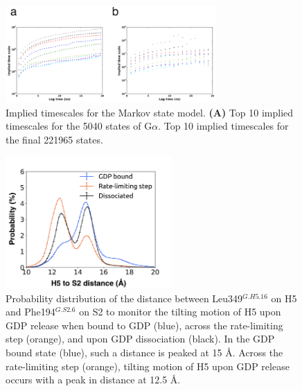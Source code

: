 \documentclass[../main.tex]{subfiles}
\begin{document}
    \begin{figure}[!htb] %
        \centering
        \includegraphics[width=3.16in]{ch4-fig2-supp5.png}
        \caption[Implied timescales for the Markov state model.]
            {Implied timescales for the Markov state model. \textbf{(A)} Top 10 implied timescales for the 5040 states of G$\alpha$.  Top 10 implied timescales for the final 221965 states.}
        \label{fig:ch4-fig2-supp5}
    \end{figure}

    \begin{figure}[!htb] %
        \centering
        \includegraphics[width=2.5in]{ch4-fig3-supp1.png}
        \caption[Probability distribution of the distance between Leu349$^{G.H5.16}$ on H5 and Phe194$^{G.S2.6}$ on S2 to monitor the tilting motion of H5 upon GDP release when bound to GDP (blue), across the rate-limiting step (orange), and upon GDP dissociation (black).]
            {Probability distribution of the distance between Leu349$^{G.H5.16}$ on H5 and Phe194$^{G.S2.6}$ on S2 to monitor the tilting motion of H5 upon GDP release when bound to GDP (blue), across the rate-limiting step (orange), and upon GDP dissociation (black). In the GDP bound state (blue), such a distance is peaked at 15 \AA. Across the rate-limiting step (orange), tilting motion of H5 upon GDP release occurs with a peak in distance at 12.5 \AA.}
        \label{fig:ch4-fig3-supp1}
    \end{figure}
\end{document}

